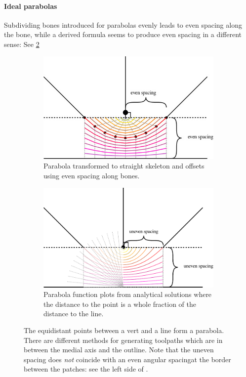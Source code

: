 \paragraph{Ideal parabolas}
Subdividing bones introduced for parabolas evenly leads to even spacing along the bone,
while a derived formula seems to produce even spacing in a different sense:
See \cref{medial_axis_parabolas}

\begin{figure}[H]
\begin{subfigure}{0.9\columnwidth}
\includegraphics[width=\columnwidth]{sources/method/medial_axis_even_spacing.jpg}
\caption{Parabola transformed to straight skeleton and offsets using even spacing along bones.}
\end{subfigure}
\begin{subfigure}{0.9\columnwidth}
\includegraphics[width=\columnwidth]{sources/method/medial_axis_uneven_spacing.pdf}
\caption{Parabola function plots from analytical solutions where the distance to the point is a whole fraction of the distance to the line.}
\label{medial_axis_parabolas_functions}
\end{subfigure}
\caption{The equidistant points between a vert and a line form a parabola. There are different methods for generating toolpaths which are in between the medial axis and the outline. Note that the uneven spacing does \emph{not} coincide with an even angular spacingat the border between the patches: see the left side of .}
\label{medial_axis_parabolas}
\end{figure}

